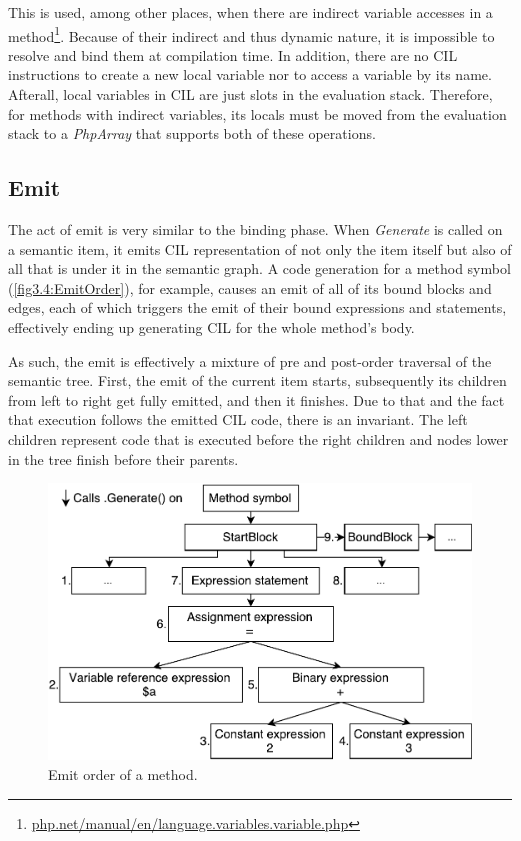 This is used, among other places, when there are indirect variable accesses in a method\footnote{\href{http://php.net/manual/en/language.variables.variable.php}{php.net/manual/en/language.variables.variable.php}}. Because of their indirect and thus dynamic nature, it is impossible to resolve and bind them at compilation time. In addition, there are no CIL instructions to create a new local variable nor to access a variable by its name. Afterall, local variables in CIL are just slots in the evaluation stack. Therefore, for methods with indirect variables, its locals must be moved from the evaluation stack to a \emph{PhpArray} that supports both of these operations.

\subsection{Emit}

The act of emit is very similar to the binding phase. When \emph{Generate} is called on a semantic item, it emits CIL representation of not only the item itself but also of all that is under it in the semantic graph. A code generation for a method symbol (\autoref{fig3.4:EmitOrder}), for example, causes an emit of all of its bound blocks and edges, each of which triggers the emit of their bound expressions and statements, effectively ending up generating CIL for the whole method’s body. 

As such, the emit is effectively a mixture of pre and post-order traversal of the semantic tree. First, the emit of the current item starts, subsequently its children from left to right get fully emitted, and then it finishes. Due to that and the fact that execution follows the emitted CIL code, there is an invariant. The left children represent code that is executed before the right children and nodes lower in the tree finish before their parents. 

\begin{figure}[h]
	\centering	
	\includegraphics[scale=0.75]{../img/3_4_emitorder}	
	\caption{Emit order of a method.}
	\label{fig3.4:EmitOrder}
\end{figure}

